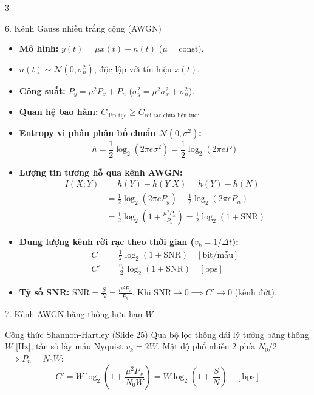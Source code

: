 \documentclass[10pt,landscape,a4paper]{article}
\begin{document}
\begin{multicols*}{3}
\begin{cheatbox}{6. Kênh Gauss nhiễu trắng cộng (AWGN)}
\begin{itemize}[leftmargin=*,noitemsep]
    \item \textbf{Mô hình:} $y(t) = \mu x(t) + n(t)$ ($\mu = \text{const}$).
    \item $n(t) \sim \mathcal{N}(0, \sigma_n^2)$, độc lập với tín hiệu $x(t)$.
    \item \textbf{Công suất:} $P_y = \mu^2 P_x + P_n$ ($\sigma_y^2 = \mu^2 \sigma_x^2 + \sigma_n^2$).
    \item \textbf{Quan hệ bao hàm:} $C_{\text{liên tục}} \ge C_{\text{rời rạc chứa liên tục}}$.
    \item \textbf{Entropy vi phân phân bố chuẩn $\mathcal{N}(0, \sigma^2)$:}
    \[ h = \frac{1}{2}\log_2(2\pi e \sigma^2) = \frac{1}{2}\log_2(2\pi e P) \]
    \item \textbf{Lượng tin tương hỗ qua kênh AWGN:}
    \begin{align*}
        I(X; Y) &= h(Y) - h(Y|X) = h(Y) - h(N) \\
                &= \frac{1}{2}\log_2(2\pi e P_y) - \frac{1}{2}\log_2(2\pi e P_n) \\
                &= \frac{1}{2}\log_2 \left(1 + \frac{\mu^2 P_x}{P_n}\right) = \frac{1}{2}\log_2(1 + \text{SNR})
    \end{align*}
    \item \textbf{Dung lượng kênh rời rạc theo thời gian ($v_k = 1/\Delta t$):}
    \begin{align*}
        C &= \frac{1}{2}\log_2(1 + \text{SNR}) \quad [\text{bit/mẫu}] \\
        C' &= \frac{v_k}{2}\log_2(1 + \text{SNR}) \quad [\text{bps}]
    \end{align*}
    \item \textbf{Tỷ số SNR:} $\text{SNR} = \frac{S}{N} = \frac{\mu^2 P_x}{P_n}$.
    Khi $\text{SNR} \to 0 \implies C' \to 0$ (kênh đứt).
\end{itemize}
\end{cheatbox}

\begin{cheatbox}{7. Kênh AWGN băng thông hữu hạn $W$}
\begin{subbox}{Công thức Shannon-Hartley (Slide 25)}
Qua bộ lọc thông dải lý tưởng băng thông $W$ [Hz], tần số lấy mẫu Nyquist $v_k = 2W$. Mật độ phổ nhiễu 2 phía $N_0/2$ $\implies P_n = N_0 W$:
\[ C' = W \log_2 \left(1 + \frac{\mu^2 P_x}{N_0 W}\right) = W \log_2 \left(1 + \frac{S}{N}\right) \quad [\text{bps}] \]
\end{subbox}


\end{cheatbox}
\end{multicols*}
\end{document}
